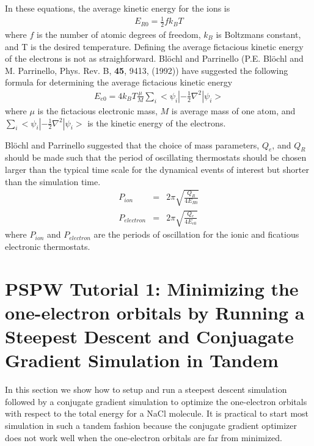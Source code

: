 In these equations, the average kinetic energy for the ions is
\begin{eqnarray}
E_{R0} = \frac{1}{2} f k_B T
\end{eqnarray}
where $f$ is the number of atomic degrees of freedom, $k_B$ is 
Boltzmans constant, and T is the desired temperature.  Defining
the average fictacious kinetic energy of the electrons is not as straighforward.
Bl\"{o}chl and Parrinello 
(P.E. Bl\"{o}chl and M. Parrinello, Phys. Rev. B, \textbf{45}, 9413, (1992)) 
have suggested the following formula for determining
the average fictacious kinetic energy
\begin{eqnarray}
E_{e0} = 4 k_B T \frac{\mu}{M} \sum_i <\psi_i|-\frac{1}{2} \nabla^2 |\psi_i>
\end{eqnarray}
where $\mu$ is the fictacious electronic mass, $M$ is average mass of one atom,
and $\sum_i <\psi_i|-\frac{1}{2} \nabla^2 |\psi_i>$ is the kinetic energy of the
electrons.

Bl\"{o}chl and Parrinello suggested that the choice of mass parameters, 
$Q_e$, and $Q_R$ should be made such that the period of oscillating thermostats 
should be chosen larger than the typical time scale for the dynamical events of 
interest but shorter than the simulation time.  
\begin{eqnarray}
P_{ion} &=& 2\pi \sqrt{\frac{Q_R}{4E_{R0}}}\\
P_{electron} &=& 2\pi \sqrt{\frac{Q_e}{4E_{e0}}}
\end{eqnarray}
where $P_{ion}$ and $P_{electron}$ are the periods of oscillation for the ionic and ficatious
electronic thermostats.  




\section{PSPW Tutorial 1: Minimizing the one-electron orbitals by Running a Steepest Descent and Conjuagate Gradient Simulation in Tandem}
\label{sec:pspw_sd}

In this section we show how to setup and run a steepest descent
simulation followed by a conjugate gradient simulation to optimize 
the one-electron orbitals with respect to 
the total energy for a NaCl molecule.  It is practical to
start most simulation in such a tandem fashion because the
conjugate gradient optimizer does not work well when the
one-electron orbitals are far from minimized. 

